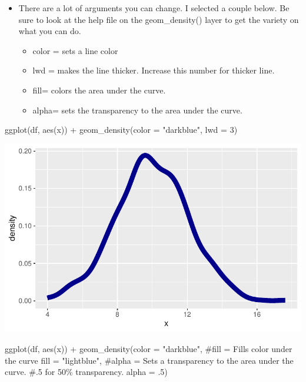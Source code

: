\documentclass[
  letterpaper,
  DIV=11,
  numbers=noendperiod]{scrreprt}
\newenvironment{Shaded}{\begin{snugshade}}{\end{snugshade}}
\newcommand{\AttributeTok}[1]{\textcolor[rgb]{0.40,0.45,0.13}{#1}}
\newcommand{\CommentTok}[1]{\textcolor[rgb]{0.37,0.37,0.37}{#1}}
\newcommand{\DecValTok}[1]{\textcolor[rgb]{0.68,0.00,0.00}{#1}}
\newcommand{\FunctionTok}[1]{\textcolor[rgb]{0.28,0.35,0.67}{#1}}
\newcommand{\NormalTok}[1]{\textcolor[rgb]{0.00,0.23,0.31}{#1}}
\newcommand{\SpecialCharTok}[1]{\textcolor[rgb]{0.37,0.37,0.37}{#1}}
\newcommand{\StringTok}[1]{\textcolor[rgb]{0.13,0.47,0.30}{#1}}
\providecommand{\tightlist}{%
  \setlength{\itemsep}{0pt}\setlength{\parskip}{0pt}}\usepackage{longtable,booktabs,array}
\begin{document}
\begin{itemize}
\tightlist
\item
  There are a lot of arguments you can change. I selected a couple
  below. Be sure to look at the help file on the geom\_density() layer
  to get the variety on what you can do.

  \begin{itemize}
  \tightlist
  \item
    color = sets a line color
  \item
    lwd = makes the line thicker. Increase this number for thicker line.
  \item
    fill= colors the area under the curve.
  \item
    alpha= sets the transparency to the area under the curve.
  \end{itemize}
\end{itemize}

\begin{Shaded}
\begin{Highlighting}[]
\FunctionTok{ggplot}\NormalTok{(df, }\FunctionTok{aes}\NormalTok{(x)) }\SpecialCharTok{+} \FunctionTok{geom\_density}\NormalTok{(}\AttributeTok{color =} \StringTok{"darkblue"}\NormalTok{, }\AttributeTok{lwd =} \DecValTok{3}\NormalTok{)}
\end{Highlighting}
\end{Shaded}

\includegraphics{dataviz_files/figure-pdf/unnamed-chunk-22-1.pdf}

\begin{Shaded}
\begin{Highlighting}[]
\FunctionTok{ggplot}\NormalTok{(df, }\FunctionTok{aes}\NormalTok{(x)) }\SpecialCharTok{+}
  \FunctionTok{geom\_density}\NormalTok{(}\AttributeTok{color =} \StringTok{"darkblue"}\NormalTok{, }
    \CommentTok{\#fill = Fills color under the curve}
    \AttributeTok{fill =} \StringTok{"lightblue"}\NormalTok{,}
    \CommentTok{\#alpha = Sets a transparency to the area under the curve. }
    \CommentTok{\#.5 for 50\% transparency. }
    \AttributeTok{alpha =}\NormalTok{ .}\DecValTok{5}\NormalTok{) }
\end{Highlighting}
\end{Shaded}
\end{document}
